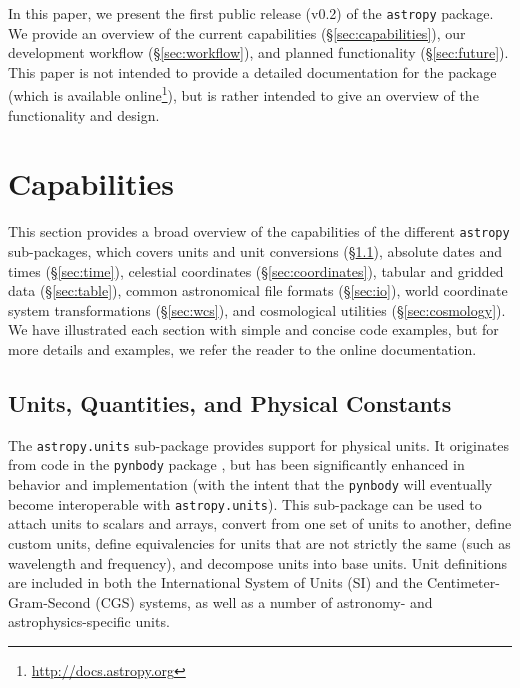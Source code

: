 \documentclass[traditabstract]{aa}
\newcommand{\astropy}{\texttt{astropy}\xspace}
\begin{document}
In this paper, we present the first public release (v0.2) of the \astropy
package. We provide an overview of the current capabilities
(\S\ref{sec:capabilities}), our development workflow (\S\ref{sec:workflow}),
and planned functionality (\S\ref{sec:future}). This paper is not intended to
provide a detailed documentation for the package (which is available
online\footnote{\url{http://docs.astropy.org}}), but is rather intended to give
an overview of the functionality and design.

\section{Capabilities}

This section provides a broad overview of the capabilities of the different
\astropy sub-packages, which covers units and unit conversions
(\S\ref{sec:units_main}), absolute dates and times (\S\ref{sec:time}),
celestial coordinates (\S\ref{sec:coordinates}), tabular and gridded data
(\S\ref{sec:table}), common astronomical file formats (\S\ref{sec:io}), world
coordinate system transformations (\S\ref{sec:wcs}), and cosmological utilities
(\S\ref{sec:cosmology}). We have illustrated each section with simple and
concise code examples, but for more details and examples, we refer the reader
to the online documentation.\footnotemark[3]

\label{sec:capabilities}

\subsection{Units, Quantities, and Physical Constants}

\label{sec:units_main}


The \texttt{astropy.units} sub-package provides support for physical units. It
originates from code in the \texttt{pynbody} package \citep{pynbody}, but has been
significantly enhanced in behavior and implementation (with the intent that the \texttt{pynbody} will eventually become interoperable with \texttt{astropy.units}). This sub-package can be
used to attach units to scalars and arrays, convert from one set of units to
another, define custom units, define equivalencies for units that are not
strictly the same (such as wavelength and frequency), and decompose units into
base units. Unit definitions are included in both the International System of
Units (SI) and the Centimeter-Gram-Second (CGS) systems, as well as a number of
astronomy- and astrophysics-specific units.
\end{document}
